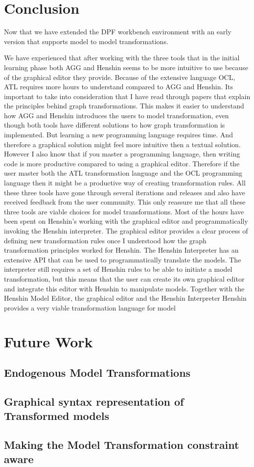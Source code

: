 \section{Conclusion}

Now that we have extended the DPF workbench environment with an early version
that supports model to model transformations.

We have experienced that after working with the three tools that in the initial
learning phase both AGG and Henshin seems to be more intuitive to use because of the
graphical editor they provide. Because of the extensive language OCL, ATL
requires more hours to understand compared to AGG and Henshin. Its important to
take into consideration that I have read through papers that explain the
principles behind graph transformations. This makes it easier to understand how
AGG and Henshin introduces the users to model transformation, even though both
tools have different solutions to how graph transformation is implemented. But
learning a new programming language requires time. And therefore a graphical
solution might feel more intuitive then a textual solution. However I also know
that if you master a programming language, then writing code is more productive
compared to using a graphical editor. Therefore if the user master both the ATL
transformation language and the OCL programming language then it might be a
productive way of creating transformation rules. All these three tools have gone
through several iterations and releases and also have received feedback from the
user community. This only reassure me that all these three tools are viable
choices for model transformations. Most of the hours have been spent on
Henshin's working with the graphical editor and programmatically
invoking the Henshin interpreter. The graphical editor provides a clear
process of defining new transformation rules once I understood how the graph
transformation principles worked for Henshin. The Henshin Interpreter has
an extensive API that can be used to programmatically translate the
models. The interpreter still requires a set of Henshin rules to be able to
initiate a model transformation, but this means that the user can create its own
graphical editor and integrate this editor with Henshin to manipulate models.
Together with the Henshin Model Editor, the graphical editor and the Henshin
Interpreter Henshin provides a very viable transformation language for model



\section{Future Work}

\subsection{Endogenous Model Transformations}

\subsection{Graphical syntax representation of Transformed models}

\subsection{Making the Model Transformation constraint aware}
